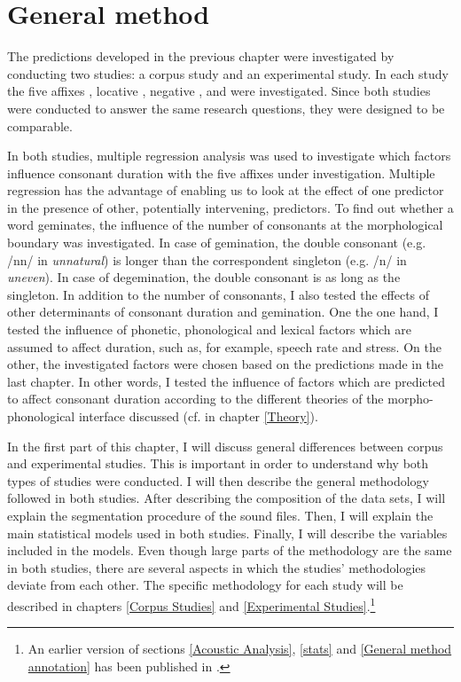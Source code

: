\chapter{General method} \label{General Method}

\vspace*{-0.3cm}

The predictions developed in the previous chapter were investigated by conducting two studies: a corpus study and an experimental study. In each study the five affixes , locative , negative ,  and  were investigated. 
Since both studies were conducted to answer the same research questions, they were designed to be comparable.  

In both studies, multiple regression analysis was used to investigate which factors influence consonant duration with the five affixes under investigation. Multiple regression has the advantage of enabling us to look at the effect of one predictor in the presence of other, potentially intervening, predictors.  
To find out whether a word geminates, the influence of the number of consonants at the morphological boundary was investigated. In case of gemination, the double consonant (e.g. /nn/ in \textit{unnatural}) is longer than the correspondent singleton (e.g. /n/ in \textit{uneven}). In case of degemination, the double consonant is as long as the singleton. In addition to the number of consonants, I also tested the effects of other determinants of consonant duration and gemination. One the one hand, I tested the influence of phonetic, phonological and lexical factors which are assumed to affect duration, such as, for example, speech rate and stress. On the other, the investigated factors were chosen based on the predictions made in the last chapter. In other words, I tested the influence of factors which are predicted to affect consonant duration according to the different theories of the morpho-phonological interface discussed (cf.  in chapter \ref{Theory}). 




In the first part of this chapter, I will discuss general differences between corpus and experimental studies. This is important in order to understand why both types of studies were conducted. I will then describe the general methodology followed in both studies. After describing the composition of the data sets, I will explain the segmentation procedure of the sound files. Then, I will explain the main statistical models used in both studies. Finally, I will describe the variables included in the models.
Even though large parts of the methodology are the same in both studies, there are several aspects in which the studies' methodologies deviate from each other. The specific methodology for each study will be described in chapters \ref{Corpus Studies} and \ref{Experimental Studies}.\footnote{An earlier version of sections \ref{Acoustic Analysis}, \ref{stats}  and \ref{General method annotation} has been published in \cite{BenHedia.2017}.}


